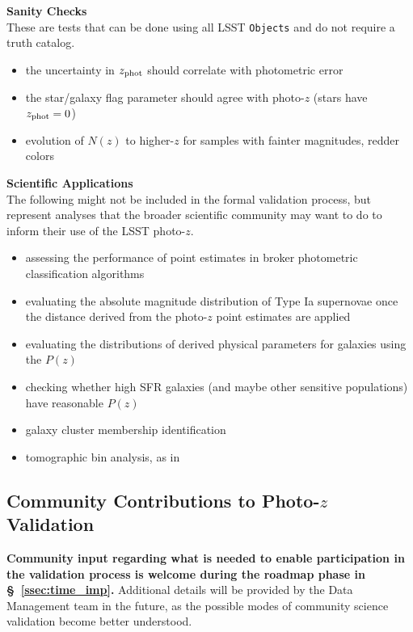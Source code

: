 \documentclass[DM,lsstdraft,toc]{lsstdoc}
\begin{document}
{\bf Sanity Checks}\\
These are tests that can be done using all LSST {\tt Objects} and do not require a truth catalog.
\vspace{-15pt}
\begin{itemize}
\item the uncertainty in $z_{\rm phot}$ should correlate with photometric error
\item the star/galaxy flag parameter should agree with photo-$z$ (stars have $z_{\rm phot}=0$)
\item evolution of $N(z)$ to higher-$z$ for samples with fainter magnitudes, redder colors
\end{itemize}

{\bf Scientific Applications}\\
The following might not be included in the formal validation process, but represent analyses that the broader scientific community may want to do to inform their use of the LSST photo-$z$.
\vspace{-15pt}
\begin{itemize}
\item assessing the performance of point estimates in broker photometric classification algorithms
\item evaluating the absolute magnitude distribution of Type Ia supernovae once the distance derived from the photo-$z$ point estimates are applied
\item evaluating the distributions of derived physical parameters for galaxies using the $P(z)$
\item checking whether high SFR galaxies (and maybe other sensitive populations) have reasonable $P(z)$
\item galaxy cluster membership identification
\item tomographic bin analysis, as in \citep{2019MNRAS.482.2807C}
\end{itemize}


\subsection{Community Contributions to Photo-$z$ Validation}\label{ssec:imp_community}

{\bf Community input regarding what is needed to enable participation in the validation process is welcome during the roadmap phase in \S~\ref{ssec:time_imp}.} Additional details will be provided by the Data Management team in the future, as the possible modes of community science validation become better understood.
\end{document}
